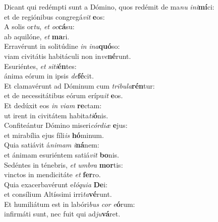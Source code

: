 \evenverse Dicant qui redémpti sunt a Dómino, quos redémit de ma\textit{nu} \textit{i}\textit{ni}\textbf{mí}ci:~\*\\
\evenverse et de regiónibus congregá\textit{vit} \textbf{e}os:\\
\oddverse A solis or\textit{tu}, \textit{et} \textit{oc}\textbf{cá}su:~\*\\
\oddverse ab aquilóne, \textit{et} \textbf{ma}ri.\\
\evenverse Erravérunt in solitúdine \textit{in} \textit{i}\textit{na}\textbf{quó}so:~\*\\
\evenverse viam civitátis habitáculi non in\textit{ve}\textbf{né}runt.\\
\oddverse Esuriéntes, \textit{et} \textit{si}\textit{ti}\textbf{én}tes:~\*\\
\oddverse ánima eórum in ipsis \textit{de}\textbf{fé}cit.\\
\evenverse Et clamavérunt ad Dóminum cum \textit{tri}\textit{bu}\textit{la}\textbf{rén}tur:~\*\\
\evenverse et de necessitátibus eórum erípu\textit{it} \textbf{e}os.\\
\oddverse Et dedúxit eos \textit{in} \textit{vi}\textit{am} \textbf{re}ctam:~\*\\
\oddverse ut irent in civitátem habita\textit{ti}\textbf{ó}nis.\\
\evenverse Confiteántur Dómino miseri\textit{cór}\textit{di}\textit{æ} \textbf{e}jus:~\*\\
\evenverse et mirabília ejus fíli\textit{is} \textbf{hó}minum.\\
\oddverse Quia satiávit á\textit{ni}\textit{mam} \textit{i}\textbf{ná}nem:~\*\\
\oddverse et ánimam esuriéntem satiá\textit{vit} \textbf{bo}nis.\\
\evenverse Sedéntes in ténebris, \textit{et} \textit{um}\textit{bra} \textbf{mor}tis:~\*\\
\evenverse vinctos in mendicitáte \textit{et} \textbf{fer}ro.\\
\oddverse Quia exacerbavérunt e\textit{ló}\textit{qui}\textit{a} \textbf{De}i:~\*\\
\oddverse et consílium Altíssimi irri\textit{ta}\textbf{vé}runt.\\
\evenverse Et humiliátum est in labóri\textit{bus} \textit{cor} \textit{e}\textbf{ó}rum:~\*\\
\evenverse infirmáti sunt, nec fuit qui ad\textit{ju}\textbf{vá}ret.\\
